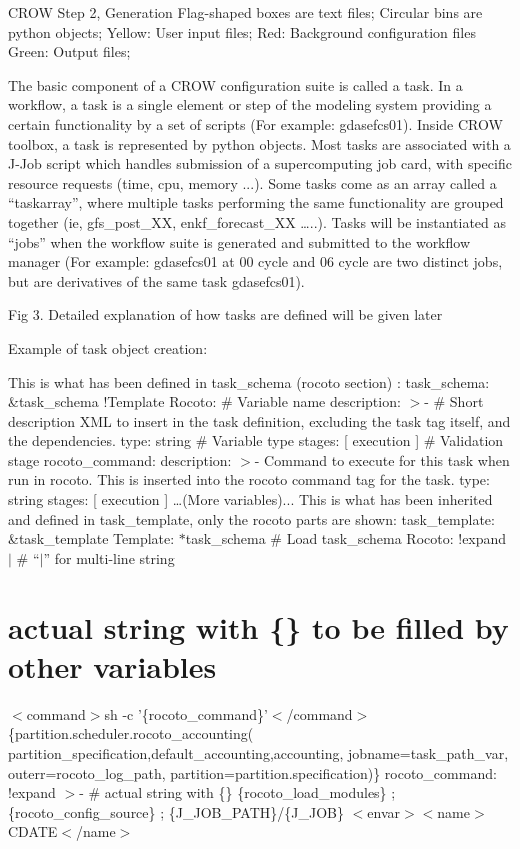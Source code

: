 C\-R\-O\-W Step 2, Generation Flag-\/shaped boxes are text files; Circular bins are python objects; Yellow\-: User input files; Red\-: Background configuration files Green\-: Output files;

The basic component of a C\-R\-O\-W configuration suite is called a task. In a workflow, a task is a single element or step of the modeling system providing a certain functionality by a set of scripts (For example\-: gdasefcs01). Inside C\-R\-O\-W toolbox, a task is represented by python objects. Most tasks are associated with a J-\/\-Job script which handles submission of a supercomputing job card, with specific resource requests (time, cpu, memory ...). Some tasks come as an array called a “taskarray”, where multiple tasks performing the same functionality are grouped together (ie, gfs\-\_\-post\-\_\-\-X\-X, enkf\-\_\-forecast\-\_\-\-X\-X …..). Tasks will be instantiated as “jobs” when the workflow suite is generated and submitted to the workflow manager (For example\-: gdasefcs01 at 00 cycle and 06 cycle are two distinct jobs, but are derivatives of the same task gdasefcs01).

Fig 3. Detailed explanation of how tasks are defined will be given later

Example of task object creation\-:

This is what has been defined in task\-\_\-schema (rocoto section) \-: task\-\_\-schema\-: \&task\-\_\-schema !\-Template Rocoto\-: \# Variable name description\-: $>$-\/ \# Short description X\-M\-L to insert in the task definition, excluding the task tag itself, and the dependencies. type\-: string \# Variable type stages\-: \mbox{[} execution \mbox{]} \# Validation stage rocoto\-\_\-command\-: description\-: $>$-\/ Command to execute for this task when run in rocoto. This is inserted into the rocoto command tag for the task. type\-: string stages\-: \mbox{[} execution \mbox{]} …(\-More variables)... This is what has been inherited and defined in task\-\_\-template, only the rocoto parts are shown\-: task\-\_\-template\-: \&task\-\_\-template Template\-: $\ast$task\-\_\-schema \# Load task\-\_\-schema Rocoto\-: !expand $|$ \# “$|$” for multi-\/line string \section*{actual string with \{\} to be filled by other variables}

$<$command$>$sh -\/c '\{rocoto\-\_\-command\}'$<$/command$>$ \{partition.\-scheduler.\-rocoto\-\_\-accounting( partition\-\_\-specification,default\-\_\-accounting,accounting, jobname=task\-\_\-path\-\_\-var, outerr=rocoto\-\_\-log\-\_\-path, partition=partition.\-specification)\} rocoto\-\_\-command\-: !expand $>$-\/ \# actual string with \{\} \{rocoto\-\_\-load\-\_\-modules\} ; \{rocoto\-\_\-config\-\_\-source\} ; \{J\-\_\-\-J\-O\-B\-\_\-\-P\-A\-T\-H\}/\{J\-\_\-\-J\-O\-B\} $<$envar$>$$<$name$>$C\-D\-A\-T\-E$<$/name$>$

